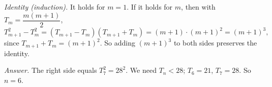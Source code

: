 \emph{Identity (induction).} It holds for $m=1$. If it holds for $m$, then with $T_m=\dfrac{m(m+1)}2$,
\[T_{m+1}^2-T_m^2=(T_{m+1}-T_m)(T_{m+1}+T_m)=(m+1)\cdot(m+1)^2=(m+1)^3,\]
since $T_{m+1}+T_m=(m+1)^2$. So adding $(m+1)^3$ to both sides preserves the identity.

\emph{Answer.} The right side equals $T_7^2=28^2$. We need $T_n<28$; $T_6=21$, $T_7=28$. So $n=\boxed{6}$.
